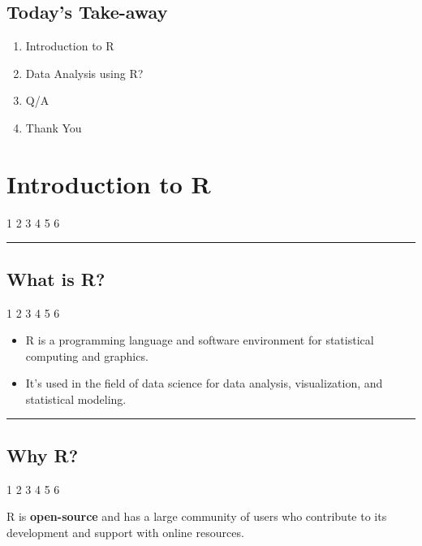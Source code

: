 \documentclass[
  letterpaper,
  DIV=11,
  numbers=noendperiod]{scrartcl}
\providecommand{\tightlist}{%
  \setlength{\itemsep}{0pt}\setlength{\parskip}{0pt}}\usepackage{longtable,booktabs,array}
\begin{document}
\hypertarget{todays-take-away-1}{%
\subsection{Today's Take-away}\label{todays-take-away-1}}

\begin{enumerate}
\def\labelenumi{\arabic{enumi}.}
\tightlist
\item
  Introduction to R
\item
  Data Analysis using R?
\item
  Q/A
\item
  Thank You
\end{enumerate}

\hypertarget{introduction-to-r}{%
\section{Introduction to R}\label{introduction-to-r}}

1 {2 3 4 5 6}

\begin{center}\rule{0.5\linewidth}{0.5pt}\end{center}

\hypertarget{what-is-r}{%
\subsection{What is R?}\label{what-is-r}}

1 {2 3 4 5 6}

\begin{itemize}
\tightlist
\item
  R is a programming language and software environment for statistical
  computing and graphics.
\item
  It's used in the field of data science for data analysis,
  visualization, and statistical modeling.
\end{itemize}

\begin{center}\rule{0.5\linewidth}{0.5pt}\end{center}

\hypertarget{why-r}{%
\subsection{Why R?}\label{why-r}}

1 {2 3 4 5 6}

R is {\textbf{open-source}} and has a large community of users who
contribute to its development and support with online resources.
\end{document}
